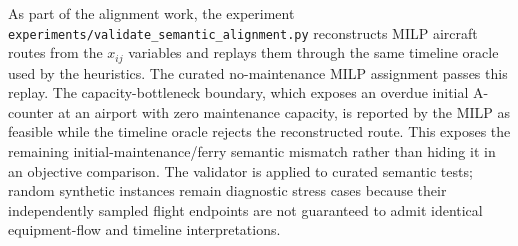 As part of the alignment work, the experiment
\texttt{experiments/validate\_semantic\_alignment.py} reconstructs MILP
aircraft routes from the $x_{ij}$ variables and replays them through the same
timeline oracle used by the heuristics. The curated no-maintenance MILP
assignment passes this replay. The capacity-bottleneck boundary, which exposes
an overdue initial A-counter at an airport with zero maintenance capacity, is
reported by the MILP as feasible while the timeline oracle rejects the
reconstructed route. This exposes the remaining initial-maintenance/ferry
semantic mismatch rather than hiding it in an objective comparison. The
validator is applied to curated semantic tests; random synthetic instances
remain diagnostic stress cases because their independently sampled flight
endpoints are not guaranteed to admit identical equipment-flow and timeline
interpretations.

\begin{table}[t]
\centering\scriptsize
\caption{Measured instance-level coverage in the nine-instance,
seven-heuristic tournament. Each entry is assigned flights over total flights;
therefore the table remains valid even when objective semantics differ.}
\label{tab:full_tournament_coverage}
\end{table}

